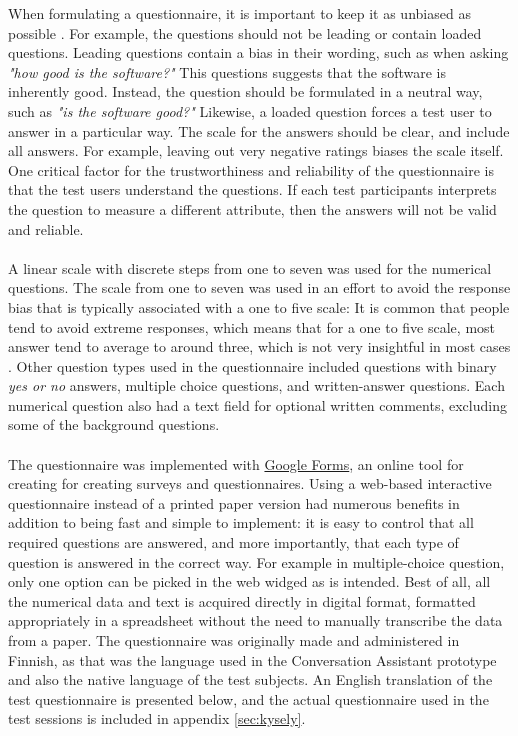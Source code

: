 \documentclass[english, 12pt, a4paper, pdftex, elec, utf8]{aaltothesis}
\begin{document}
When formulating a questionnaire, it is important to keep it as unbiased as possible \cite{rubin2008handbook, dumas1999, nielsen1993usability}. For example, the questions should not be leading or contain loaded questions. Leading questions contain a bias in their wording, such as when asking \textit{"how good is the software?"} This questions suggests that the software is inherently good. Instead, the question should be formulated in a neutral way, such as \textit{"is the software good?"} Likewise, a loaded question forces a test user to answer in a particular way. The scale for the answers should be clear, and include all answers. For example, leaving out very negative ratings biases the scale itself. One critical factor for the trustworthiness and reliability of the questionnaire is that the test users understand the questions. If each test participants interprets the question to measure a different attribute, then the answers will not be valid and reliable. \\\\
A linear scale with discrete steps from one to seven was used for the numerical questions. The scale from one to seven was used in an effort to avoid the response bias that is typically associated with a one to five scale: It is common that people tend to avoid extreme responses, which means that for a one to five scale, most answer tend to average to around three, which is not very insightful in most cases \cite{rubin2008handbook}. Other question types used in the questionnaire included questions with binary \textit{yes or no} answers, multiple choice questions, and written-answer questions. Each numerical question also had a text field for optional written comments, excluding some of the background questions. \\\\
The questionnaire was implemented with \href{https://www.google.com/forms/about/}{Google Forms}, an online tool for creating for creating surveys and questionnaires. Using a web-based interactive questionnaire instead of a printed paper version had numerous benefits in addition to being fast and simple to implement: it is easy to control that all required questions are answered, and more importantly, that each type of question is answered in the correct way. For example in multiple-choice question, only one option can be picked in the web widged as is intended. Best of all, all the numerical data and text is acquired directly in digital format, formatted appropriately in a spreadsheet without the need to manually transcribe the data from a paper. The questionnaire was originally made and administered in Finnish, as that was the language used in the Conversation Assistant prototype and also the native language of the test subjects. An English translation of the test questionnaire is presented below, and the actual questionnaire used in the test sessions is included in appendix \ref{sec:kysely}. \\
\end{document}
